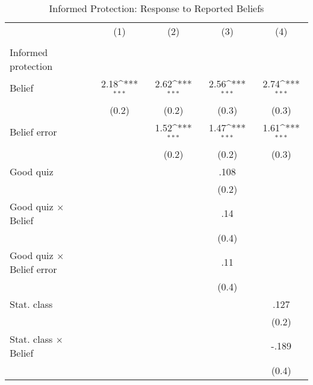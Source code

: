 \begin{table}[htbp]\centering
\def\sym#1{\ifmmode^{#1}\else\(^{#1}\)\fi}
\caption{Informed Protection: Response to Reported Beliefs}
\begin{tabular}{l*{4}{c}}
\hline\hline
                &\multicolumn{1}{c}{(1)}&\multicolumn{1}{c}{(2)}&\multicolumn{1}{c}{(3)}&\multicolumn{1}{c}{(4)}\\
                &\multicolumn{1}{c}{}&\multicolumn{1}{c}{}&\multicolumn{1}{c}{}&\multicolumn{1}{c}{}\\
\hline
Informed protection&                  &                  &                  &                  \\
Belief          &     2.18\sym{***}&     2.62\sym{***}&     2.56\sym{***}&     2.74\sym{***}\\
                &    (0.2)         &    (0.2)         &    (0.3)         &    (0.3)         \\
Belief error    &                  &     1.52\sym{***}&     1.47\sym{***}&     1.61\sym{***}\\
                &                  &    (0.2)         &    (0.2)         &    (0.3)         \\
Good quiz       &                  &                  &     .108         &                  \\
                &                  &                  &    (0.2)         &                  \\
Good quiz $\times$ Belief&                  &                  &      .14         &                  \\
                &                  &                  &    (0.4)         &                  \\
Good quiz $\times$ Belief error&                  &                  &      .11         &                  \\
                &                  &                  &    (0.4)         &                  \\
Stat. class     &                  &                  &                  &     .127         \\
                &                  &                  &                  &    (0.2)         \\
Stat. class $\times$ Belief&                  &                  &                  &    -.189         \\
                &                  &                  &                  &    (0.4)         \\

\end{tabular}
\end{table}

